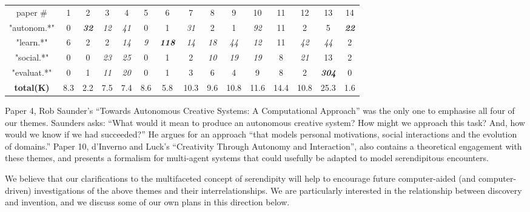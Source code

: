 \medskip

{\centering \setlength{\tabcolsep}{5pt} \tiny
\begin{tabular}{ccccccccccccccc}
paper \#
&1
&2
&3
&4
&5
&6
&7
&8
&9
&10
&11
&12
&13
&14
\\
\cline{2-15}
"autonom.*"
&0
&\textbf{\emph{32}}
&\emph{12}
&\emph{41}
&0
&1
&\emph{31}
&2
&1
&\emph{92}
&11
&2
&5
&\textbf{\emph{22}}
\\
"learn.*"
&6
&2
&2
&\emph{14}
&\emph{9}
&\textbf{\emph{118}}
&\emph{14}
&\emph{18}
&\emph{44}
&\emph{12}
&11
&\emph{42}
&\emph{44}
&2
\\
"social.*"
&0
&0
&\emph{23}
&\emph{25}
&0
&1
&2
&\emph{10}
&\emph{19}
&\emph{19}
&8
&\emph{21}
&13
&2
\\
"evaluat.*"
&0
&1
&\emph{11}
&\emph{20}
&0
&1
&3
&6
&4
&9
&8
&2
&\textbf{\emph{304}}
&0
\\
\cline{2-15}
\textbf{total(K)}
& 8.3  %
& 2.2  %
& 7.5  %
& 7.4  %
& 8.6  %
& 5.8  %
&10.3 %
& 9.6  %
&10.8 %
&11.6 %
&14.4 %
&10.8 %
&25.3 %
& 1.6  %
\\
\end{tabular}
}

\bigskip

Paper 4, Rob Saunder's \citeyear{saunders2012towards} ``Towards
Autonomous Creative Systems: A Computational Approach'' was the only
one to emphasise all four of our themes.  Saunders asks: ``What would
it mean to produce an autonomous creative system? How might we
approach this task? And, how would we know if we had succeeded?''  He
argues for an approach ``that models personal motivations, social
interactions and the evolution of domains.''  Paper 10, d'Inverno and
Luck's \citeyear{d2012creativity} ``Creativity Through Autonomy and
Interaction'', also contains a theoretical engagement with these
themes, and presents a formalism for multi-agent systems that could
usefully be adapted to model serendipitous encounters.

We believe that our clarifications to the multifaceted concept of
serendipity will help to encourage future computer-aided (and
computer-driven) investigations of the above themes and their
interrelationships.  We are particularly interested in the
relationship between discovery and invention, and we discuss some of
our own plans in this direction below.
